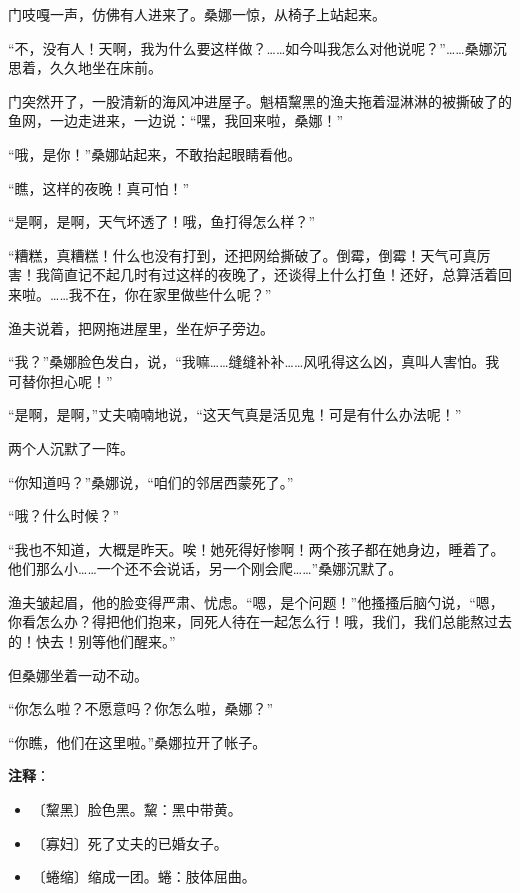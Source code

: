 \documentclass[12pt,UTF-8,openany]{ctexbook}
\begin{document}
\begin{Large}
    门吱嘎一声，仿佛有人进来了。桑娜一惊，从椅子上站起来。
    
    “不，没有人！天啊，我为什么要这样做？……如今叫我怎么对他说呢？”……桑娜沉思着，久久地坐在床前。
    
    门突然开了，一股清新的海风冲进屋子。魁梧黧黑的渔夫拖着湿淋淋的被撕破了的鱼网，一边走进来，一边说：“嘿，我回来啦，桑娜！”
    
    “哦，是你！”桑娜站起来，不敢抬起眼睛看他。
    
    “瞧，这样的夜晚！真可怕！”
    
    “是啊，是啊，天气坏透了！哦，鱼打得怎么样？”
    
    “糟糕，真糟糕！什么也没有打到，还把网给撕破了。倒霉，倒霉！天气可真厉害！我简直记不起几时有过这样的夜晚了，还谈得上什么打鱼！还好，总算活着回来啦。……我不在，你在家里做些什么呢？”
    
    渔夫说着，把网拖进屋里，坐在炉子旁边。
    
    “我？”桑娜脸色发白，说，“我嘛……缝缝补补……风吼得这么凶，真叫人害怕。我可替你担心呢！”
    
    “是啊，是啊，”丈夫喃喃地说，“这天气真是活见鬼！可是有什么办法呢！”
    
    两个人沉默了一阵。
    
    “你知道吗？”桑娜说，“咱们的邻居西蒙死了。”
    
    “哦？什么时候？”
    
    “我也不知道，大概是昨天。唉！她死得好惨啊！两个孩子都在她身边，睡着了。他们那么小……一个还不会说话，另一个刚会爬……”桑娜沉默了。
    
    渔夫皱起眉，他的脸变得严肃、忧虑。“嗯，是个问题！”他搔搔后脑勺说，“嗯，你看怎么办？得把他们抱来，同死人待在一起怎么行！哦，我们，我们总能熬过去的！快去！别等他们醒来。”
    
    但桑娜坐着一动不动。
    
    “你怎么啦？不愿意吗？你怎么啦，桑娜？”
    
    “你瞧，他们在这里啦。”桑娜拉开了帐子。
    
\end{Large}


\newpage

\textbf{注释}：

\vspace{-1em}

\begin{itemize}
    \setlength\itemsep{-0.2em}
    \item 〔黧黑〕脸色黑。黧：黑中带黄。
    \item 〔寡妇〕死了丈夫的已婚女子。
    \item 〔蜷缩〕缩成一团。蜷：肢体屈曲。
\end{itemize}
\end{document}
